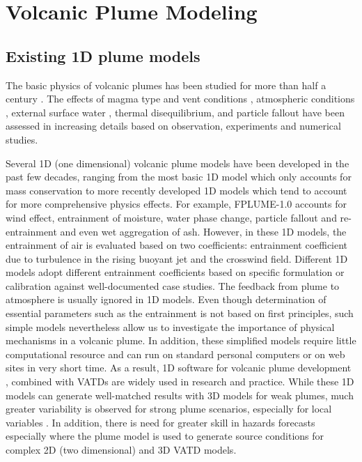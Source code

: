\section{Volcanic Plume Modeling}
\subsection{Existing 1D plume models}
The basic physics of volcanic plumes has been studied for more than half a century \citep{morton1956turbulent, settle1978volcanic, wilson1978control}. The effects of magma type and vent conditions \citep{woods1988fluid, woods1995decompression}, atmospheric conditions \citep{ woods1993moist, sparks1997volcanic, bursik2001effect}, external surface water \citep{koyaguchi1996formation}, thermal disequilibrium, and particle fallout \citep{woods1991particle} have been assessed in increasing details based on observation, experiments and numerical studies.

Several 1D (one dimensional) volcanic plume models have been developed in the past few decades, ranging from the most basic 1D model \citep{woods1988fluid} which only accounts for mass conservation to more recently developed 1D models  \citep{bursik2001effect, mastin2007user, degruyter2012improving, woodhouse2013interaction, devenish2013using, girault2014effect, de2015plume, vitturi2015plume, folch2016fplume, pouget2016sensitivity} which tend to account for more comprehensive physics effects. 
For example, FPLUME-1.0 \citep{folch2016fplume} accounts for wind effect, entrainment of moisture, water phase change, particle fallout and re-entrainment and even wet aggregation of ash. However, in these 1D models, the entrainment of air is evaluated based on two coefficients: entrainment coefficient due to turbulence in the rising buoyant jet and the crosswind field. Different 1D models adopt different entrainment coefficients based on specific formulation or calibration against well-documented case studies. The feedback from plume to atmosphere is usually ignored in 1D models. Even though determination of essential parameters such as the entrainment is not based on first principles, such simple models nevertheless allow us to investigate the importance of physical mechanisms in a volcanic plume. In addition, these simplified models require little computational resource and can run on standard personal computers or on web sites in very short time. As a result, 1D software for volcanic plume development \citep[such as][]{267, 1194, 3541}, combined with VATDs \citep[such as][]{114} are widely used in research and practice. While these 1D models can generate well-matched results with 3D models for weak plumes, much greater variability is observed for strong plume scenarios, especially for local variables \citep{costa2016results}. In addition, there is need for greater skill in hazards forecasts especially where the plume model is used to generate source conditions for complex 2D (two dimensional) and 3D VATD models.

